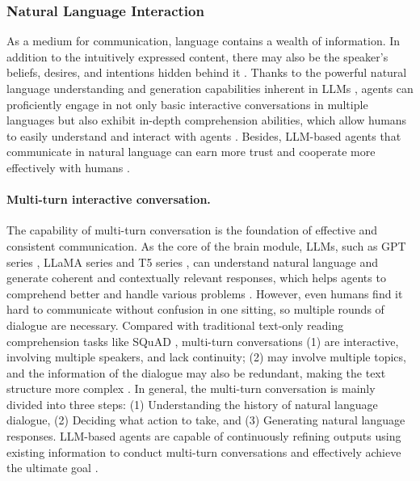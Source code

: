 \subsubsection{Natural Language Interaction}\label{sec:Natural Language Interaction}
As a medium for communication, language contains a wealth of information. In addition to the intuitively expressed content, there may also be the speaker's beliefs, desires, and intentions hidden behind it \cite{searle2007language}. Thanks to the powerful natural language understanding and generation capabilities inherent in LLMs \cite{DBLP:journals/corr/abs-2303-08774,DBLP:journals/corr/abs-2302-13971,  DBLP:journals/corr/abs-2211-05100, almazrouei2023falcon}, agents can proficiently engage in not only basic interactive conversations \cite{DBLP:journals/corr/SerbanLCP16, DBLP:journals/corr/VinyalsL15, DBLP:journals/corr/abs-2001-09977} in multiple languages \cite{DBLP:journals/corr/abs-2302-04023,DBLP:journals/corr/abs-2211-05100} but also exhibit in-depth comprehension abilities, which allow humans to easily understand and interact with agents \cite{DBLP:journals/corr/abs-2305-17066, DBLP:conf/eacl/RollerDGJWLXOSB21}. Besides, LLM-based agents that communicate in natural language can earn more trust and cooperate more effectively with humans \cite{DBLP:journals/corr/abs-2307-02485}.

\paragraph{Multi-turn interactive conversation.}
The capability of multi-turn conversation is the foundation of effective and consistent communication. As the core of the brain module, LLMs, such as GPT series \cite{radford2019language, DBLP:conf/nips/BrownMRSKDNSSAA20, DBLP:journals/corr/abs-2302-13971}, LLaMA series \cite{DBLP:journals/corr/abs-2302-13971, taori2023stanford} and T5 series \cite{DBLP:journals/corr/abs-2210-11416,raffel2020exploring}, can understand natural language and generate coherent and contextually relevant responses, which helps agents to comprehend better and handle various problems \cite{DBLP:journals/corr/abs-2304-04370}. However, even humans find it hard to communicate without confusion in one sitting, so multiple rounds of dialogue are necessary. Compared with traditional text-only reading comprehension tasks like SQuAD \cite{DBLP:conf/emnlp/RajpurkarZLL16}, multi-turn conversations (1) are interactive, involving multiple speakers, and lack continuity; (2) may involve multiple topics, and the information of the dialogue may also be redundant, making the text structure more complex \cite{DBLP:journals/corr/abs-2103-03125}. In general, the multi-turn conversation is mainly divided into three steps: (1) Understanding the history of natural language dialogue, (2) Deciding what action to take, and (3) Generating natural language responses. LLM-based agents are capable of continuously refining outputs using existing information to conduct multi-turn conversations and effectively achieve the ultimate goal \cite{DBLP:journals/corr/abs-2302-04023,DBLP:journals/corr/abs-2103-03125}.


